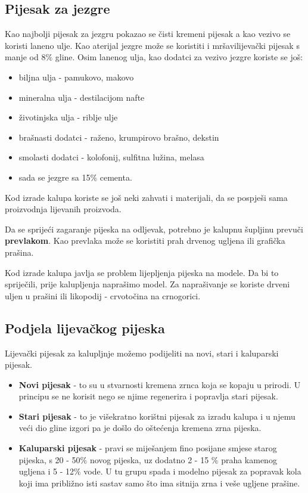 \documentclass[a4paper,12pt]{article}
\numberwithin{figure}{section}
\begin{document}
\subsection{Pijesak za jezgre}
Kao najbolji pijesak za jezgru pokazao se čisti kremeni pijesak a kao vezivo se koristi laneno ulje. Kao aterijal jezgre može se koristiti i mršavilijevački pijesak s manje od 8$\%$ gline. Osim lanenog ulja, kao dodatci za vezivo jezgre koriste se još:
\begin{itemize}
\item biljna ulja - pamukovo, makovo
\item mineralna ulja - destilacijom nafte
\item životinjska ulja - riblje ulje
\item brašnasti dodatci - raženo, krumpirovo brašno, dekstin
\item smolasti dodatci - kolofonij, sulfitna lužina, melasa
\item sada se jezgre sa 15$\%$ cementa.
\end{itemize}
Kod izrade kalupa koriste se još neki zahvati i materijali, da se pospješi sama proizvodnja lijevanih proizvoda.\par
Da se sprijeći zagaranje pijeska na odljevak, potrebno je kalupnu  šupljinu prevuči \textbf{prevlakom}. Kao prevlaka može se koristiti prah drvenog ugljena ili grafička prašina.\par
Kod izrade kalupa javlja se problem lijepljenja pijeska na modele. Da bi to spriječili, prije kalupljenja naprašimo model. Za naprašivanje se koriste drveni uljen u prašini ili likopodij - crvotočina na crnogorici.
\subsection{Podjela lijevačkog pijeska}
Lijevački pijesak za kalupljnje možemo podijeliti na novi, stari i kaluparski pijesak.
\begin{itemize}
\item \textbf{Novi pijesak} - to su u stvarnosti kremena zrnca koja se kopaju u prirodi. U principu se ne korisit nego se njime regenerira i popravlja stari pijesak.
\item \textbf{Stari pijesak} - to je višekratno korištni pijesak za izradu kalupa i u njemu veći dio gline izgori pa je došlo do oštećenja kremena zrna pijeska.
\item \textbf{Kaluparski pijesak} - pravi se miješanjem fino posijane smjese starog pijeska, s 20 - 50$\%$ novog pijeska, uz dodatno 2 - 15 $\%$ praha kamenog ugljena i 5 - 12$\%$  vode. U tu grupu spada i modelno pijesak za popravak kola koji ima približno isti sastav samo što ima sitnija zrna i veše ugljene prašine.
\end{itemize}
\end{document}
